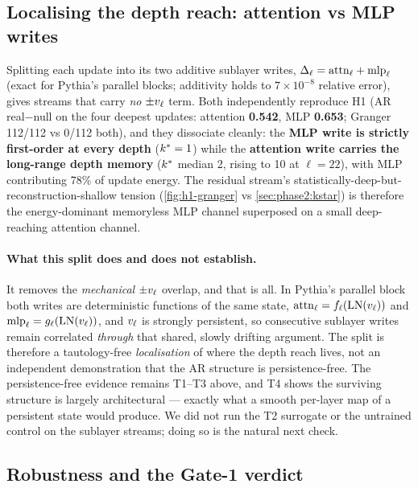 \subsection{Localising the depth reach: attention vs MLP writes}
\label{sec:phase1:sublayer}

Splitting each update into its two additive sublayer writes,
$\Delta_\ell = \mathrm{attn}_\ell + \mathrm{mlp}_\ell$ (exact for Pythia's parallel
blocks; additivity holds to $7\times10^{-8}$ relative error), gives streams
that carry \emph{no} $\pm v_\ell$ term. Both independently reproduce H1
(AR real$-$null on the four deepest updates: attention \textbf{0.542}, MLP
\textbf{0.653}; Granger 112/112 vs 0/112 both), and they dissociate cleanly:
the \textbf{MLP write is strictly first-order at
every depth} ($k^{\ast}=1$) while the \textbf{attention write carries the
long-range depth memory} ($k^{\ast}$ median 2, rising to 10 at $\ell{=}22$),
with MLP contributing 78\% of update energy. The residual stream's
statistically-deep-but-reconstruction-shallow tension
(\cref{fig:h1-granger} vs \cref{sec:phase2:kstar}) is therefore the
energy-dominant memoryless MLP channel superposed on a small deep-reaching
attention channel.

\paragraph{What this split does and does not establish.} It removes the
\emph{mechanical} $\pm v_\ell$ overlap, and that is all. In Pythia's parallel
block both writes are deterministic functions of the same state,
$\mathrm{attn}_\ell = f_\ell(\mathrm{LN}(v_\ell))$ and
$\mathrm{mlp}_\ell = g_\ell(\mathrm{LN}(v_\ell))$, and $v_\ell$ is strongly
persistent, so consecutive sublayer writes remain correlated \emph{through}
that shared, slowly drifting argument. The split is therefore a
tautology-free \emph{localisation} of where the depth reach lives, not an
independent demonstration that the AR structure is persistence-free. The
persistence-free evidence remains T1--T3 above, and T4 shows the surviving
structure is largely architectural --- exactly what a smooth per-layer map of
a persistent state would produce. We did not run the T2 surrogate or the
untrained control on the sublayer streams; doing so is the natural next check.

\subsection{Robustness and the Gate-1 verdict}
\label{sec:phase1:verdict}

